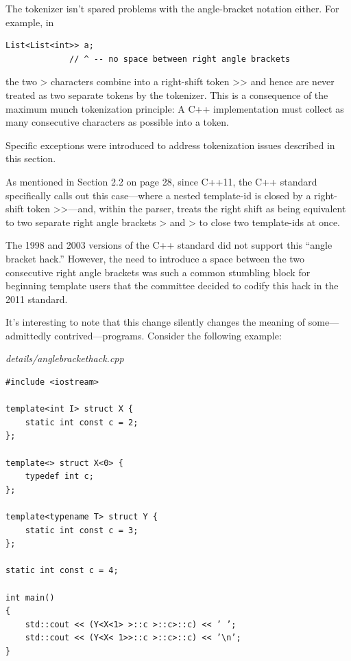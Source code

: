 The tokenizer isn’t spared problems with the angle-bracket notation either. For example, in

\begin{lstlisting}[style=styleCXX]
List<List<int>> a;
			 // ^ -- no space between right angle brackets
\end{lstlisting}

the two > characters combine into a right-shift token >> and hence are never treated as two separate tokens by the tokenizer. This is a consequence of the maximum munch tokenization principle: A C++ implementation must collect as many consecutive characters as possible into a token.

\begin{tcolorbox}[colback=webgreen!5!white,colframe=webgreen!75!black]
\hspace*{0.75cm}Specific exceptions were introduced to address tokenization issues described in this section.
\end{tcolorbox}

As mentioned in Section 2.2 on page 28, since C++11, the C++ standard specifically calls out this case—where a nested template-id is closed by a right-shift token >>—and, within the parser, treats the right shift as being equivalent to two separate right angle brackets > and > to close two template-ids at once.

\begin{tcolorbox}[colback=webgreen!5!white,colframe=webgreen!75!black]
\hspace*{0.75cm}The 1998 and 2003 versions of the C++ standard did not support this “angle bracket hack.” However, the need to introduce a space between the two consecutive right angle brackets was such a common stumbling block for beginning template users that the committee decided to codify this hack in the 2011 standard.
\end{tcolorbox}

It’s interesting to note that this change silently changes the meaning of some—admittedly contrived—programs. Consider the following example:

\noindent
\textit{details/anglebrackethack.cpp}
\begin{lstlisting}[style=styleCXX]
#include <iostream>

template<int I> struct X {
	static int const c = 2;
};

template<> struct X<0> {
	typedef int c;
};

template<typename T> struct Y {
	static int const c = 3;
};

static int const c = 4;

int main()
{
	std::cout << (Y<X<1> >::c >::c>::c) << ’ ’;
	std::cout << (Y<X< 1>>::c >::c>::c) << ’\n’;
}
\end{lstlisting}

